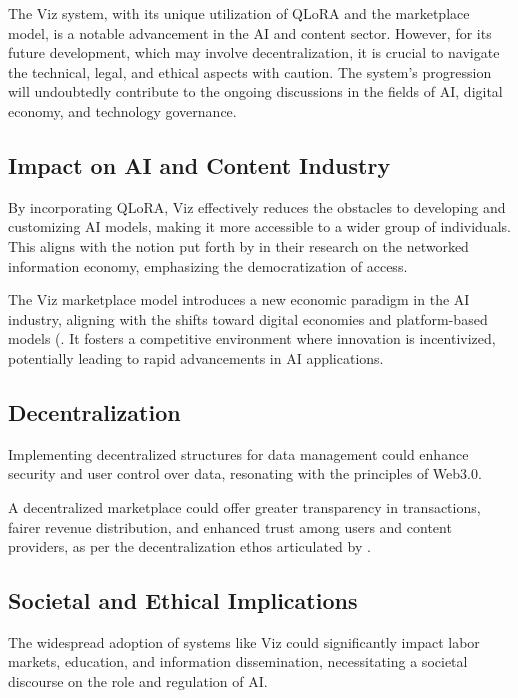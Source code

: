 \documentclass{article}
\begin{document}
The Viz system, with its unique utilization of QLoRA and the marketplace model, is a notable advancement in the AI and content sector. However, for its future development, which may involve decentralization, it is crucial to navigate the technical, legal, and ethical aspects with caution. The system's progression will undoubtedly contribute to the ongoing discussions in the fields of AI, digital economy, and technology governance.

\subsection{Impact on AI and Content Industry}

By incorporating QLoRA, Viz effectively reduces the obstacles to developing and customizing AI models, making it more accessible to a wider group of individuals. This aligns with the notion put forth by \cite{benker2006wealth} in their research on the networked information economy, emphasizing the democratization of access.

The Viz marketplace model introduces a new economic paradigm in the AI industry, aligning with the shifts toward digital economies and platform-based models (\citep{parker2016platform}. It fosters a competitive environment where innovation is incentivized, potentially leading to rapid advancements in AI applications.

\subsection{Decentralization}

Implementing decentralized structures for data management could enhance security and user control over data, resonating with the principles of Web3.0.

A decentralized marketplace could offer greater transparency in transactions, fairer revenue distribution, and enhanced trust among users and content providers, as per the decentralization ethos articulated by \cite{benker2006wealth}.

\subsection{Societal and Ethical Implications}

The widespread adoption of systems like Viz could significantly impact labor markets, education, and information dissemination, necessitating a societal discourse on the role and regulation of AI.
\end{document}
